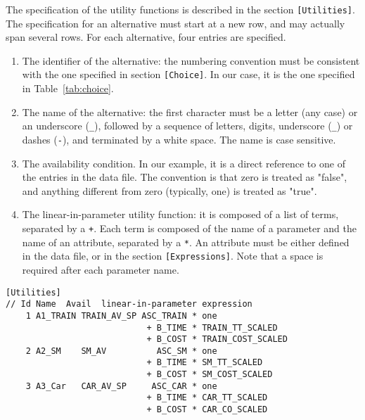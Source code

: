\documentclass[12pt,a4paper]{article}
\begin{document}
The specification of the
utility functions is described in the section \lstinline$[Utilities]$.
 The specification for an alternative
must start at a new row, and may actually span several rows. 
For each alternative, four entries are specified.
\begin{enumerate}
\item The identifier of the alternative: the numbering convention
  must be consistent with the one specified in section
  \lstinline$[Choice]$. In our case, it is the one specified in Table~\ref{tab:choice}.
\item The name of the alternative:  the first character must be a letter
  (any case) or an underscore (\verb+_+), followed by a sequence of
  letters, digits, underscore (\verb+_+) or dashes (\verb+-+), and
  terminated by a white space. The name is case sensitive. 
\item The availability condition. In our example, it is a direct
reference to one of the entries  in the data file. The convention is
that zero is treated as "false", and anything different from zero
(typically, one) is treated as "true".
\item  The linear-in-parameter utility function: it is composed of a list of terms,
         separated by a \texttt{+}. Each term is composed of the name of a
         parameter and the name of an attribute,
         separated by a \texttt{*}. An attribute must be either defined in
         the data file, or in the section \lstinline$[Expressions]$.
         Note that a space is required  after each parameter name.
\end{enumerate}


\begin{lstlisting}[style=nonumbers]
[Utilities]
// Id Name  Avail  linear-in-parameter expression
    1 A1_TRAIN TRAIN_AV_SP ASC_TRAIN * one 
                            + B_TIME * TRAIN_TT_SCALED 
                            + B_COST * TRAIN_COST_SCALED
    2 A2_SM    SM_AV          ASC_SM * one
                            + B_TIME * SM_TT_SCALED
                            + B_COST * SM_COST_SCALED
    3 A3_Car   CAR_AV_SP     ASC_CAR * one 
                            + B_TIME * CAR_TT_SCALED
                            + B_COST * CAR_CO_SCALED
\end{lstlisting}
\end{document}
